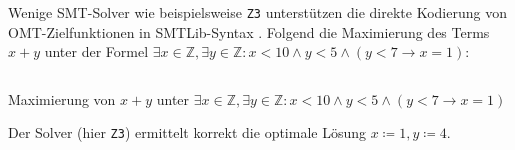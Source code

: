Wenige SMT-Solver wie beispielsweise \texttt{Z3} unterstützen die direkte Kodierung von OMT-Zielfunktionen in SMTLib-Syntax \cite{nuz3}.
Folgend die Maximierung des Terms $x + y$ unter der Formel $\exists x \in \mathbb{Z}, \exists y \in \mathbb{Z}: x < 10 \land y < 5 \land (y < 7 \rightarrow x = 1)$:

\begin{listing}[H]
    \inputminted[linenos=true]{bash}{Code/SMT/OMTSimple.smt2}
    \caption{Maximierung von $x + y$ unter $\exists x \in \mathbb{Z}, \exists y \in \mathbb{Z}: x < 10 \land y < 5 \land (y < 7 \rightarrow x = 1)$}
    \label{listing:omtsimple}
\end{listing}

Der Solver (hier \texttt{Z3}) ermittelt korrekt die optimale Lösung $x \coloneqq 1, y \coloneqq 4$.